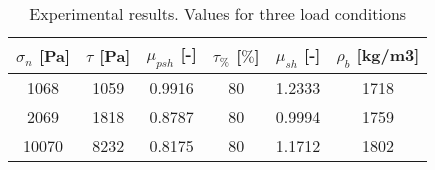 \begin{table}[h]
\centering
\begin{tabular}{cccccc}
\hline
$\sigma_n$ [Pa] & $\tau$ [Pa] & $\mu_{psh}$ [-] & $\tau_{\%}$ [$\%$] &
$\mu_{sh}$ [-] & $\rho_b$ [kg/m3] \\
\hline
    1068  & 1059  & 0.9916 & 80 & 1.2333 & 1718 \\
    2069  & 1818  & 0.8787 & 80 & 0.9994 & 1759 \\
    10070 & 8232  & 0.8175 & 80 & 1.1712 & 1802 \\

\hline
\end{tabular}
\caption[Experimental sinter fine]{Experimental results. Values for three
load conditions}
\label{tab:05sinterTableExperimental}
\end{table}